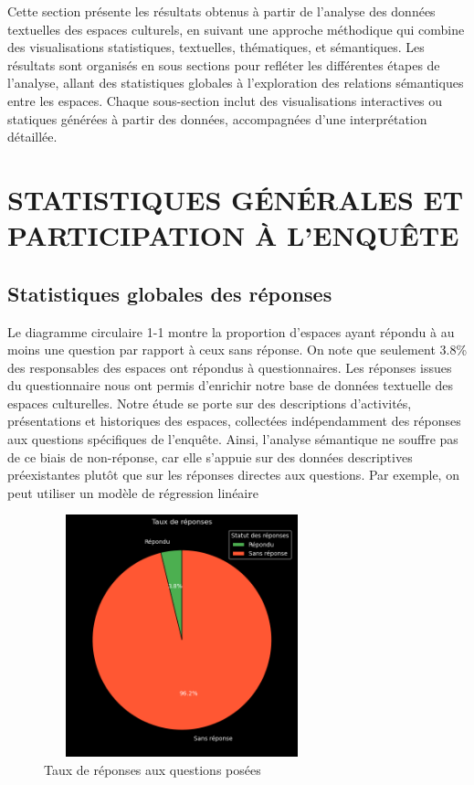 \documentclass[mstat,12pt]{unswthesis}
\begin{document}
Cette section présente les résultats obtenus à partir de l’analyse des données textuelles des espaces culturels, en suivant une approche méthodique qui combine des visualisations statistiques, textuelles, thématiques, et sémantiques. Les résultats sont organisés en sous sections pour refléter les différentes étapes de l’analyse, allant des statistiques globales à l’exploration des relations sémantiques entre les espaces. Chaque sous-section inclut des visualisations interactives ou statiques générées à partir des données, accompagnées d’une interprétation détaillée.

\hypertarget{STATISTIQUES GÉNÉRALES ET PARTICIPATION À L'ENQUÊTE}{%
\section{STATISTIQUES GÉNÉRALES ET PARTICIPATION À L'ENQUÊTE }\label{STATISTIQUES GÉNÉRALES ET PARTICIPATION À L'ENQUÊTE }}

\bigskip

\subsection{Statistiques globales des réponses }

\bigskip

Le diagramme circulaire 1-1 montre la proportion d’espaces ayant répondu à au moins une 
question par rapport à ceux sans réponse. On note que seulement 3.8\% des responsables des 
espaces ont répondus à questionnaires. Les réponses issues du questionnaire nous ont permis 
d’enrichir notre base de données textuelle des espaces culturelles. Notre étude se porte sur des 
descriptions d'activités, présentations et historiques des espaces, collectées indépendamment 
des réponses aux questions spécifiques de l'enquête. Ainsi, l'analyse sémantique ne souffre 
pas de ce biais de non-réponse, car elle s'appuie sur des données descriptives préexistantes 
plutôt que sur les réponses directes aux questions.
Par exemple, on peut utiliser un modèle de régression linéaire

\begin{figure}[H]
    \centering
    \includegraphics[width=8cm,height=7cm]{Enquete.png}
    \caption{Taux de réponses aux questions posées }
    \label{fig:enquete}
\end{figure}
\end{document}
